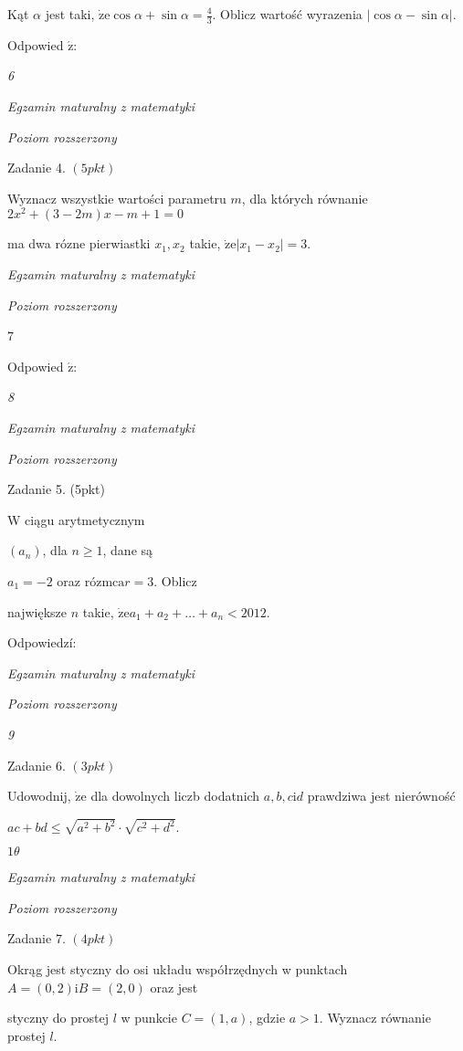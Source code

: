 \documentclass[a4paper,12pt]{article}
\begin{document}
Kąt $\alpha$ jest taki, $\displaystyle \dot{\mathrm{z}}\mathrm{e}\cos\alpha+\sin\alpha=\frac{4}{3}$. Oblicz wartość wyrazenia $|\cos\alpha-\sin\alpha|.$

Odpowied $\acute{\mathrm{z}}$:





{\it 6}

{\it Egzamin maturalny z matematyki}

{\it Poziom rozszerzony}

Zadanie 4. $(5pkt)$

Wyznacz wszystkie wartości parametru $m$, dla których równanie $2x^{2}+(3-2m)x-m+1=0$

ma dwa rózne pierwiastki $x_{1}, x_{2}$ takie, $\dot{\mathrm{z}}\mathrm{e}|x_{1}-x_{2}|=3.$





{\it Egzamin maturalny z matematyki}

{\it Poziom rozszerzony}

7

Odpowied $\acute{\mathrm{z}}$:





{\it 8}

{\it Egzamin maturalny z matematyki}

{\it Poziom rozszerzony}

Zadanie 5. (5pkt)

W ciągu arytmetycznym

$(a_{n})$, dla $n\geq 1$, dane są

$a_{1}=-2$ oraz róz$\mathrm{m}\mathrm{c}\mathrm{a} r=3$. Oblicz

największe $n$ takie, $\dot{\mathrm{z}}\mathrm{e}a_{1}+a_{2}+\ldots+a_{n}<2012.$

Odpowiedzí:





{\it Egzamin maturalny z matematyki}

{\it Poziom rozszerzony}

{\it 9}

Zadanie 6. $(3pkt)$

Udowodnij, $\dot{\mathrm{z}}\mathrm{e}$ dla dowolnych liczb dodatnich $a, b, c \mathrm{i} d$ prawdziwa jest nierówność

$ac+bd\leq\sqrt{a^{2}+b^{2}}\cdot\sqrt{c^{2}+d^{2}}.$





$ 1\theta$

{\it Egzamin maturalny z matematyki}

{\it Poziom rozszerzony}

Zadanie 7. $(4pkt)$

Okrąg jest styczny do osi układu współrzędnych w punktach $A=(0,2) \mathrm{i}B=(2,0)$ oraz jest

styczny do prostej $l$ w punkcie $C=(1,a)$, gdzie $a>1$. Wyznacz równanie prostej $l.$
\end{document}
